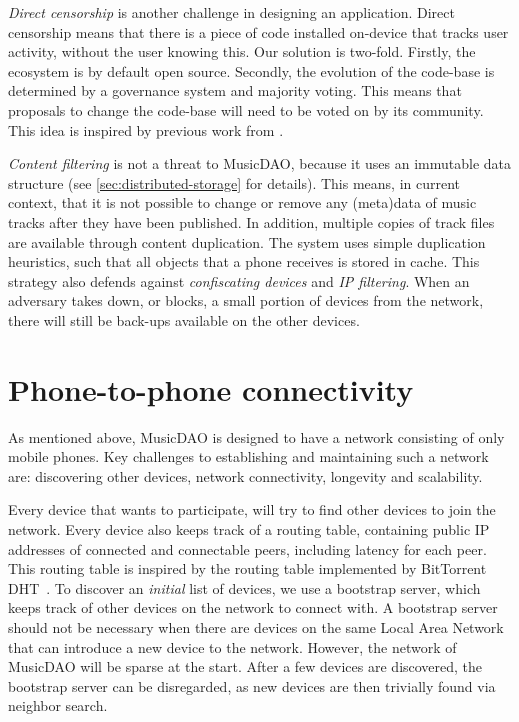 \textit{Direct censorship} is another challenge in designing an application. Direct censorship means that there is a piece of code installed on-device that tracks user activity, without the user knowing this. Our solution is two-fold. Firstly, the ecosystem is by default open source. Secondly, the evolution of the code-base is determined by a governance system and majority voting. This means that proposals to change the code-base will need to be voted on by its community. This idea is inspired by previous work from \cite{jentzsch2016decentralized}.

\textit{Content filtering} is not a threat to MusicDAO, because it uses an immutable data structure (see \ref{sec:distributed-storage} for details). This means, in current context, that it is not possible to change or remove any (meta)data of music tracks after they have been published. In addition, multiple copies of track files are available through content duplication. The system uses simple duplication heuristics, such that all objects that a phone receives is stored in cache. This strategy also defends against \textit{confiscating devices} and \textit{IP filtering}. When an adversary takes down, or blocks, a small portion of devices from the network, there will still be back-ups available on the other devices.

\section{Phone-to-phone connectivity}
As mentioned above, MusicDAO is designed to have a network consisting of only mobile phones. Key challenges to establishing and maintaining such a network are: discovering other devices, network connectivity, longevity and scalability.

Every device that wants to participate, will try to find other devices to join the network. Every device also keeps track of a routing table, containing public IP addresses of connected and connectable peers, including latency for each peer. This routing table is inspired by the routing table implemented by BitTorrent DHT~\citep{bittorrentbep5dht}. To discover an \textit{initial} list of devices, we use a bootstrap server, which keeps track of other devices on the network to connect with. A bootstrap server should not be necessary when there are devices on the same Local Area Network that can introduce a new device to the network. However, the network of MusicDAO will be sparse at the start. After a few devices are discovered, the bootstrap server can be disregarded, as new devices are then trivially found via neighbor search.

